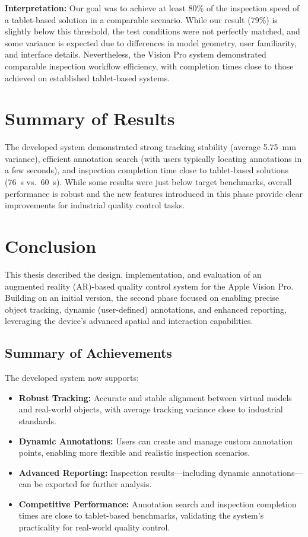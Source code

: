 \vspace{1em}
\noindent
\textbf{Interpretation:} Our goal was to achieve at least 80\% of the inspection speed of a tablet-based solution in a comparable scenario. While our result (79\%) is slightly below this threshold, the test conditions were not perfectly matched, and some variance is expected due to differences in model geometry, user familiarity, and interface details. Nevertheless, the Vision Pro system demonstrated comparable inspection workflow efficiency, with completion times close to those achieved on established tablet-based systems.


\section{Summary of Results}

The developed system demonstrated strong tracking stability (average 5.75~mm variance), efficient annotation search (with users typically locating annotations in a few seconds), and inspection completion time close to tablet-based solutions (76~s vs.\ 60~s). While some results were just below target benchmarks, overall performance is robust and the new features introduced in this phase provide clear improvements for industrial quality control tasks.

\section{Conclusion}

This thesis described the design, implementation, and evaluation of an augmented reality (AR)-based quality control system for the Apple Vision Pro. Building on an initial version, the second phase focused on enabling precise object tracking, dynamic (user-defined) annotations, and enhanced reporting, leveraging the device’s advanced spatial and interaction capabilities.

\subsection{Summary of Achievements}
The developed system now supports:
\begin{itemize}
    \item \textbf{Robust Tracking:} Accurate and stable alignment between virtual models and real-world objects, with average tracking variance close to industrial standards.
    \item \textbf{Dynamic Annotations:} Users can create and manage custom annotation points, enabling more flexible and realistic inspection scenarios.
    \item \textbf{Advanced Reporting:} Inspection results—including dynamic annotations—can be exported for further analysis.
    \item \textbf{Competitive Performance:} Annotation search and inspection completion times are close to tablet-based benchmarks, validating the system’s practicality for real-world quality control.
\end{itemize}

